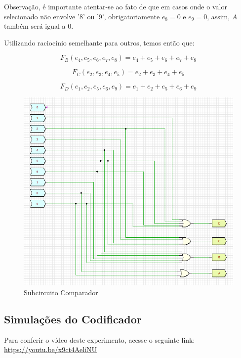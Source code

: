 \documentclass[12pt]{article}
\begin{document}
Observação, é importante atentar-se ao fato de que em casos onde o valor selecionado não envolve '8' ou '9', obrigatoriamente $e_{8}=0$ e $e_{9}=0$, assim, \textbf{$A$} também será igual a 0.

Utilizando raciocínio semelhante para outros, temos então que:

\begin{equation}
F_{B}(e_{4},e_{5},e_{6},e_{7},e_{8}) = e_{4}+e_{5}+e_{6}+e_{7}+e_{8}
\end{equation}

\begin{equation}
F_{C}(e_{2},e_{3},e_{4},e_{5}) = e_{2}+e_{3}+e_{4}+e_{5}
\end{equation}

\begin{equation}
F_{D}(e_{1},e_{2},e_{5},e_{6},e_{9}) = e_{1}+e_{2}+e_{5}+e_{6}+e_{9}
\end{equation}

\begin{figure}[htp]
    \centering
    \includegraphics[width=12cm]{Exp05/2.1.png}
    \caption{Subcircuito Comparador}
    \label{fig:galaxy}
\end{figure}


\subsection{Simulações do Codificador}\label{sec:encoder_simulations}

Para conferir o vídeo deste experimento, acesse o seguinte link:
\href{https://youtu.be/x9ct4AeliNU}{https://youtu.be/x9ct4AeliNU}
\end{document}
